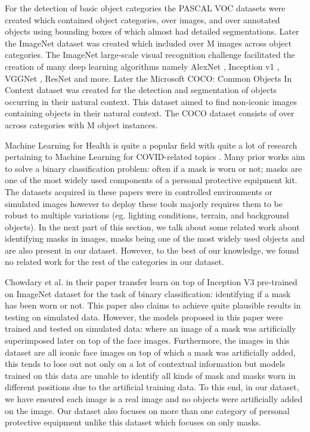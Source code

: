 \documentclass{article}
\begin{document}
For the detection of basic object categories the PASCAL VOC datasets \cite{everingham2010pascal} were created which contained  object categories, over  images, and over  annotated objects using bounding boxes of which almost  had detailed segmentations. Later the ImageNet dataset was created \cite{deng2009imagenet} which included over  M images across  object categories. The ImageNet large-scale visual recognition challenge facilitated the creation of many deep learning algorithms namely AlexNet \cite{krizhevsky2012imagenet}, Inception v1 \cite{szegedy2015going}, VGGNet \cite{simonyan2015deep}, ResNet \cite{he2016deep} and more. Later the Microsoft COCO: Common Objects In Context dataset \cite{lin2014microsoft} was created for the detection and segmentation of objects occurring in their natural context. This dataset aimed to find non-iconic images containing objects in their natural context. The COCO dataset consists of over  across  categories with  M object instances.

Machine Learning for Health is quite a popular field with quite a lot of research pertaining to Machine Learning for COVID-related topics \cite{kushwaha2020significant, alimadadi2020artificial, 10.1371/journal.pone.0235187}. Many prior works aim to solve a binary classification problem: often if a mask is worn or not; masks are one of the most widely used components of a personal protective equipment kit. The datasets acquired in these papers were in controlled environments or simulated images however to deploy these tools majorly requires them to be robust to multiple variations (eg. lighting conditions, terrain, and background objects). In the next part of this section, we talk about some related work about identifying masks in images, masks being one of the most widely used objects and are also present in our dataset. However, to the best of our knowledge, we found no related work for the rest of the categories in our dataset.

Chowdary et al. \cite{chowdary2020face} in their paper transfer learn on top of Inception V3 pre-trained on ImageNet dataset \cite{szegedy2015inceptionnv3} for the task of binary classification: identifying if a mask has been worn or not. This paper also claims to achieve quite plausible results in testing on simulated data. However, the models proposed in this paper were trained and tested on simulated data: where an image of a mask was artificially superimposed later on top of the face images. Furthermore, the images in this dataset are all iconic face images on top of which a mask was artificially added, this tends to lose out not only on a lot of contextual information but models trained on this data are unable to identify all kinds of mask and masks worn in different positions due to the artificial training data. To this end, in our dataset, we have ensured each image is a real image and no objects were artificially added on the image. Our dataset also focuses on more than one category of personal protective equipment unlike this dataset which focuses on only masks.
\end{document}
